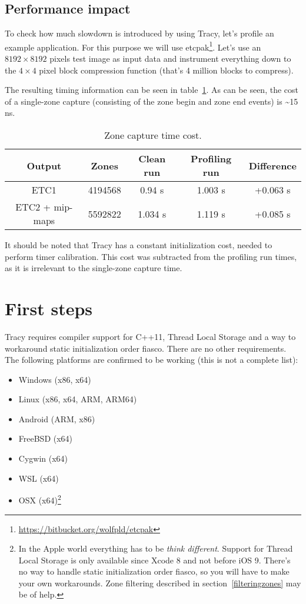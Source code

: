 \documentclass[hidelinks,titlepage,a4paper]{article}
\begin{document}
\subsection{Performance impact}
\label{perfimpact}

To check how much slowdown is introduced by using Tracy, let's profile an example application. For this purpose we will use etcpak\footnote{\url{https://bitbucket.org/wolfpld/etcpak}}. Let's use an $8192 \times 8192$ pixels test image as input data and instrument everything down to the $4 \times 4$ pixel block compression function (that's 4 million blocks to compress).

The resulting timing information can be seen in table~\ref{PerformanceImpact}. As can be seen, the cost of a single-zone capture (consisting of the zone begin and zone end events) is \textasciitilde 15 \si{\nano\second}.

\begin{table}[h]
\centering
\begin{tabular}[h]{c|c|c|c|c}
\textbf{Output} & \textbf{Zones} & \textbf{Clean run} & \textbf{Profiling run} & \textbf{Difference} \\ \hline
ETC1 & \num{4194568} & 0.94 \si{\second} & 1.003 \si{\second} & +0.063 \si{\second} \\
ETC2 + mip-maps & \num{5592822} & 1.034 \si{\second} & 1.119 \si{\second} & +0.085 \si{\second}
\end{tabular}
\caption{Zone capture time cost.}
\label{PerformanceImpact}
\end{table}

It should be noted that Tracy has a constant initialization cost, needed to perform timer calibration. This cost was subtracted from the profiling run times, as it is irrelevant to the single-zone capture time.

\section{First steps}

Tracy requires compiler support for C++11, Thread Local Storage and a way to workaround static initialization order fiasco. There are no other requirements. The following platforms are confirmed to be working (this is not a complete list):

\begin{itemize}
\item Windows (x86, x64)
\item Linux (x86, x64, ARM, ARM64)
\item Android (ARM, x86)
\item FreeBSD (x64)
\item Cygwin (x64)
\item WSL (x64)
\item OSX (x64)\footnote{In the Apple world everything has to be \emph{think different}. Support for Thread Local Storage is only available since Xcode 8 and not before iOS 9. There's no way to handle static initialization order fiasco, so you will have to make your own workarounds. Zone filtering described in section~\ref{filteringzones} may be of help.}
\end{itemize}
\end{document}
